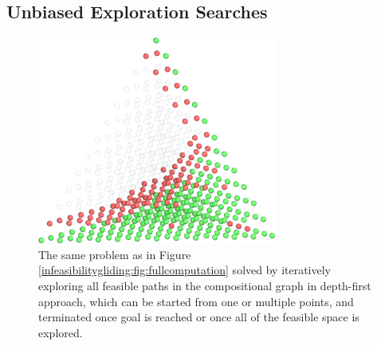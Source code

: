 \subsection{Unbiased Exploration Searches} \label{infglide:ssec:unbiasedexplore}

\todo 

\begin{figure}[H]
    \centering
    \includegraphics[width=0.7\textwidth]{infeasibilitygliding/InfeasibilityGliding_Glide.png}
    \caption{The same problem as in Figure \ref{infeasibilitygliding:fig:fullcomputation} solved by iteratively exploring all feasible paths in the compositional graph in depth-first approach, which can be started from one or multiple points, and terminated once goal is reached or once all of the feasible space is explored.}
    \label{infeasibilitygliding:fig:glide}
\end{figure}


\printbibliography[heading=subbibintoc]